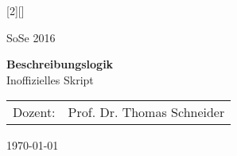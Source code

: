 [2][]{
    \thispagestyle{empty}

    \begin{minipage}[H]{\textwidth}
        \vspace{3.5cm}
        \begin{center}
                \Large SoSe 2016 

                \vspace{1cm}
                \LARGE \textbf{Beschreibungslogik} \\

                \vspace{3cm}
                \Large Inoffizielles Skript\\
        \end{center}
    \end{minipage}
    \vfill
    \vfill

    \begin{minipage}[H]{\textwidth}
        \begin{center}

                \begin{tabular}{ r l }
                  Dozent: & Prof. Dr. Thomas Schneider\\
                \end{tabular}
        \end{center}
    \end{minipage}
    \vspace{.5cm}

    \begin{center}
        \today
    \end{center}
    \newpage
}

\newcommand{\setpagestyle} {
    \pagestyle{fancy}
    \renewcommand{\headrulewidth}{0.1pt}
    \fancyhead[L]{\leftmark}
    \fancyfoot[C]{\thepage}
}

\newcommand{\settableofcontents} {
    \setcounter{tocdepth}{4}
    \tableofcontents
    \newpage
}

\newcommand{\setbibliography} {
    \clearpage
    \phantomsection
    \label{ch:bib}%
    \addcontentsline{toc}{section}{Literatur}%
        \nocite{*}%
}
